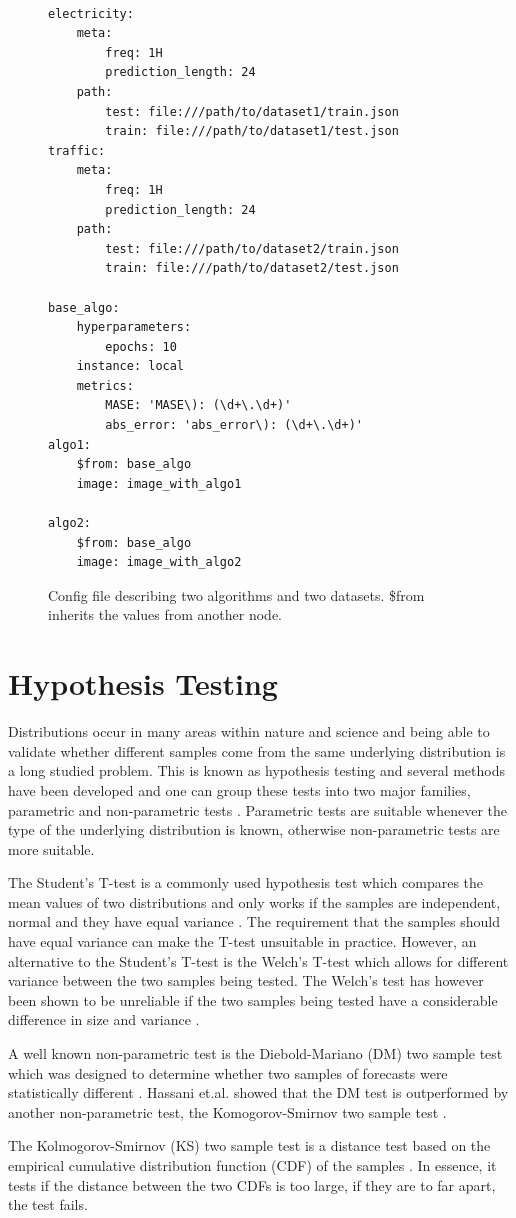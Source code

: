 \begin{figure}
  \begin{lstlisting}[]

electricity:
    meta:
        freq: 1H
        prediction_length: 24
    path:
        test: file:///path/to/dataset1/train.json
        train: file:///path/to/dataset1/test.json
traffic:
    meta:
        freq: 1H
        prediction_length: 24
    path:
        test: file:///path/to/dataset2/train.json
        train: file:///path/to/dataset2/test.json

base_algo:
    hyperparameters:
        epochs: 10
    instance: local
    metrics: 
        MASE: 'MASE\): (\d+\.\d+)'
        abs_error: 'abs_error\): (\d+\.\d+)'
algo1:
    $from: base_algo
    image: image_with_algo1

algo2:
    $from: base_algo
    image: image_with_algo2

\end{lstlisting}
  \caption{Config file describing two algorithms and two datasets. \$from inherits the values from another node.}
  \label{fig:example_config}
\end{figure}
\clearpage


\section{Hypothesis Testing}
\label{sec:hypothesis_tests}
Distributions occur in many areas within nature and science and being able to validate whether different samples come from the same underlying distribution is a long studied problem.  This is known as hypothesis testing and several methods have been developed and one can group these tests into two major families, parametric and non-parametric tests \cite{kim2015t}. Parametric tests are suitable whenever the type of the underlying distribution is known, otherwise non-parametric tests are more suitable.

The Student's T-test is a commonly used hypothesis test which compares the mean values of two distributions and only works if the samples are independent, normal and they have equal variance \cite{kim2015t}. The requirement that the samples should have equal variance can make the T-test unsuitable in practice. However, an alternative to the Student's T-test is the Welch’s T-test which allows for different variance between the two samples being tested. The Welch’s test has however been shown to be unreliable if the two samples being tested have a considerable difference in size and variance \cite{student_or_welch}.

A well known non-parametric test is the Diebold-Mariano (DM) two sample test which was designed to determine whether two samples of forecasts were statistically different \cite{diebold2015comparing}. Hassani et.al. showed that the DM test is outperformed by another non-parametric test, the Komogorov-Smirnov two sample test \cite{hassani2015kolmogorov}.

The Kolmogorov-Smirnov (KS) two sample test is a distance test based on the empirical cumulative distribution function (CDF) of the samples \cite{massey1951kolmogorov}. In essence, it tests if the distance between the two CDFs is too large, if they are to far apart, the test fails.

